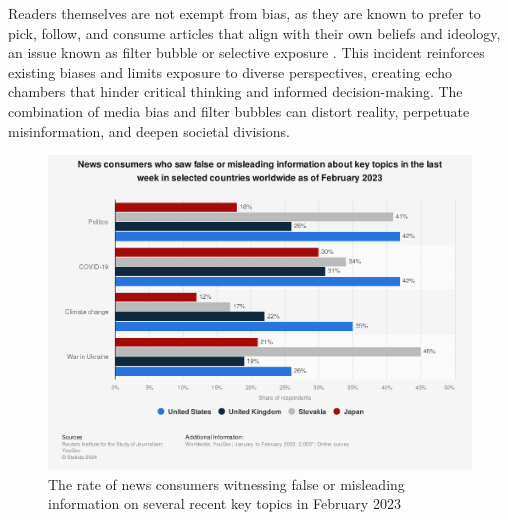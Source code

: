 Readers themselves are not exempt from bias, as they are known to prefer to pick, follow, and consume articles that align with their own beliefs and ideology, an issue known as filter bubble \cite{lim-2018-understanding} or selective exposure \cite{spinde-2024-taxonomy}. This incident reinforces existing biases and limits exposure to diverse perspectives, creating echo chambers that hinder critical thinking and informed decision-making. The combination of media bias and filter bubbles can distort reality, perpetuate misinformation, and deepen societal divisions.


\begin{figure}[htbp]
    \centering
    \includegraphics[width=0.9\linewidth]{images/statistic_id1317019_consumers-witnessing-false-information-on-certain-topics-worldwide-2023.png}
    \caption{The rate of news consumers witnessing false or misleading information on several recent key topics in February 2023 \cite{reuters-2023-false-info}}
    \label{fig:consumers-witnessing-false-information-on-certain-topics-worldwide-2023}
\end{figure}


